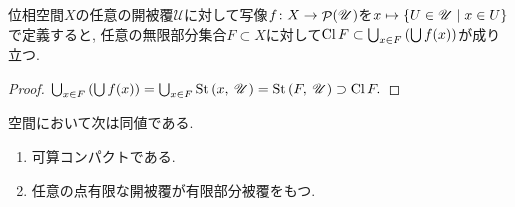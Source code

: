 \documentclass[uplatex, dvipdfmx, a4paper, 12pt, class=jsbook, crop=false]{standalone}
\begin{document}
\begin{lemma}
	\label{lem:A property on an open covering}
	位相空間$ X $の任意の開被覆$ \mathscr{U} $に対して写像$ f \colon X \to \mathop{\mathcal{P}}\nolimits(\mathscr{U}) $を$ x \mapsto \setcomp{U \in \mathscr{U}}{x \in U} $で定義すると, 任意の無限部分集合$ F \subset X $に対して$ \mathop{\mathrm{Cl}}\nolimits F \subset \bigcup_{x \in F} \left(\bigcup f(x) \right) $が成り立つ.
\end{lemma}

\begin{proof}
	$ \bigcup_{x \in F} \left(\bigcup f(x) \right) = \bigcup_{x \in F} \mathrm{St}\left(x , \: \mathscr{U}\right) = \mathrm{St}\left(F , \: \mathscr{U}\right) \supset \mathop{\mathrm{Cl}}\nolimits F. $
\end{proof}


\begin{proposition}
	 空間において次は同値である.
	\begin{enumerate}
		\item 可算コンパクトである.
		\item 任意の点有限な開被覆が有限部分被覆をもつ.
	\end{enumerate}
\end{proposition}
\end{document}
